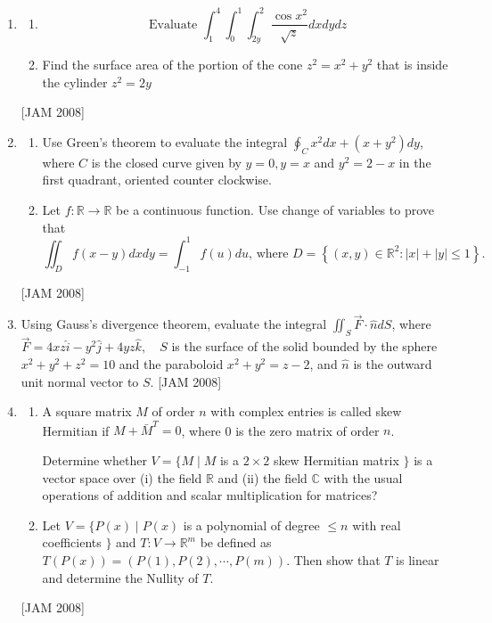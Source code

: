 \begin{enumerate}
\item 
\begin{enumerate}
\item  
$$
\text { Evaluate } \int_{1}^{4} \int_{0}^{1} \int_{2 y}^{2} \frac{\cos x^{2}}{\sqrt{z}} d x d y d z
$$
\item  Find the surface area of the portion of the cone $z^{2}=x^{2}+y^{2}$ that is inside the cylinder $z^{2}=2 y$
\end{enumerate}
 \hfill [JAM 2008]


\item 

\begin{enumerate}
\item   Use Green's theorem to evaluate the integral $\oint_{C} x^{2} d x+\left(x+y^{2}\right) d y$, where $C$ is the closed curve given by $y=0, y=x$ and $y^{2}=2-x$ in the first quadrant, oriented counter clockwise.

\item  Let $f: \mathbb{R} \rightarrow \mathbb{R}$ be a continuous function. Use change of variables to prove that
$$
\iint_{D} f(x-y) d x d y=\int_{-1}^{1} f(u) d u \text {, where } D=\left\{(x, y) \in \mathbb{R}^{2}:|x|+|y| \leq 1\right\} \text {. }
$$
\end{enumerate}
 \hfill [JAM 2008]




\item  Using Gauss's divergence theorem, evaluate the integral $\iint_{S} \vec{F} \cdot \hat{n} d S$, where $\vec{F}=4 x z \hat{i}-y^{2} \hat{j}+4 y z \hat{k}, \quad S$ is the surface of the solid bounded by the sphere $x^{2}+y^{2}+z^{2}=10$ and the paraboloid $x^{2}+y^{2}=z-2$, and $\hat{n}$ is the outward unit normal vector to $S$.
\hfill [JAM 2008]



\item
\begin{enumerate}
 \item A square matrix $M$ of order $n$ with complex entries is called skew Hermitian if $M+\bar{M}^{T}=0$, where 0 is the zero matrix of order $n$.

Determine whether $V=\{M \mid M$ is a $2 \times 2$ skew Hermitian matrix $\}$ is a vector space over (i) the field $\mathbb{R}$ and (ii) the field $\mathbb{C}$ with the usual operations of addition and scalar multiplication for matrices?

\item  Let $V=\{P(x) \mid P(x)$ is a polynomial of degree $\leq n$ with real coefficients $\}$ and $T: V \rightarrow \mathbb{R}^{m}$ be defined as $T(P(x))=(P(1), P(2), \cdots, P(m))$. Then show that $T$ is linear and determine the Nullity of $T$.
\end{enumerate}
 \hfill [JAM 2008]



\end{enumerate}
